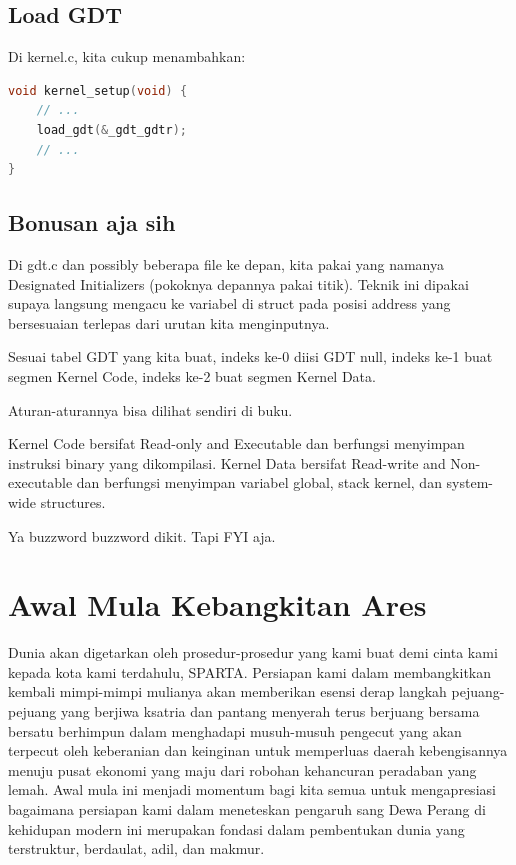 \subsection{Load GDT}

Di kernel.c, kita cukup menambahkan:

\begin{lstlisting}[language=c]
void kernel_setup(void) {
    // ...
    load_gdt(&_gdt_gdtr);
    // ...
}
\end{lstlisting}

\subsection{Bonusan aja sih}

Di gdt.c dan possibly beberapa file ke depan, kita pakai yang namanya Designated Initializers (pokoknya depannya pakai titik). Teknik ini dipakai supaya langsung mengacu ke variabel di struct pada posisi address yang bersesuaian terlepas dari urutan kita menginputnya.

Sesuai tabel GDT yang kita buat, indeks ke-0 diisi GDT null, indeks ke-1 buat segmen Kernel Code, indeks ke-2 buat segmen Kernel Data.

Aturan-aturannya bisa dilihat sendiri di buku.

Kernel Code bersifat Read-only and Executable dan berfungsi menyimpan instruksi binary yang dikompilasi. Kernel Data bersifat Read-write and Non-executable dan berfungsi menyimpan variabel global, stack kernel, dan system-wide structures.

Ya buzzword buzzword dikit. Tapi FYI aja.

\section{Awal Mula Kebangkitan Ares}

Dunia akan digetarkan oleh prosedur-prosedur yang kami buat demi cinta kami kepada kota kami terdahulu, SPARTA. Persiapan kami dalam membangkitkan kembali mimpi-mimpi mulianya akan memberikan esensi derap langkah pejuang-pejuang yang berjiwa ksatria dan pantang menyerah terus berjuang bersama bersatu berhimpun dalam menghadapi musuh-musuh pengecut yang akan terpecut oleh keberanian dan keinginan untuk memperluas daerah kebengisannya menuju pusat ekonomi yang maju dari robohan kehancuran peradaban yang lemah. Awal mula ini menjadi momentum bagi kita semua untuk mengapresiasi bagaimana persiapan kami dalam meneteskan pengaruh sang Dewa Perang di kehidupan modern ini merupakan fondasi dalam pembentukan dunia yang terstruktur, berdaulat, adil, dan makmur.